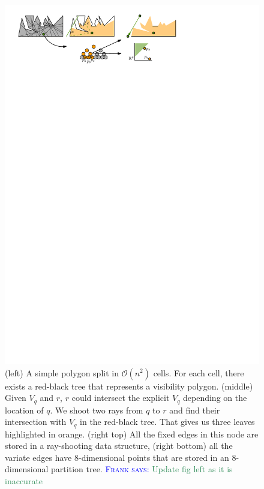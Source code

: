 \documentclass[UKenglish]{lipics-v2019}
\newcommand{\myremark}[4]{\textcolor{blue}{\textsc{#1 #2:}} \textcolor{#4}{\textsf{#3}}}
\newcommand{\frank}[2][says]{\myremark{Frank}{#1}{#2}{SeaGreen}}
\begin{document}
\begin{figure}[t]
    \centering
    \includegraphics[]{../twolevel}
    \caption{ (left) A simple polygon split in $\mathcal{O}(n^2)$
      cells. For each cell, there exists a red-black tree that
      represents a visibility polygon. (middle) Given $V_q$ and $r$,
      $r$ could intersect the explicit $V_q$ depending on the location
      of $q$. We shoot two rays from $q$ to $r$ and find their
      intersection with $V_q$ in the red-black tree. That gives us
      three leaves highlighted in orange. (right top) All the fixed
      edges in this node are stored in a ray-shooting data structure,
      (right bottom) all the variate edges have 8-dimensional points
      that are stored in an $8$-dimensional partition
      tree. \frank{Update fig left as it is inaccurate}}
    \label{fig:twolevel}
\end{figure}
\end{document}

